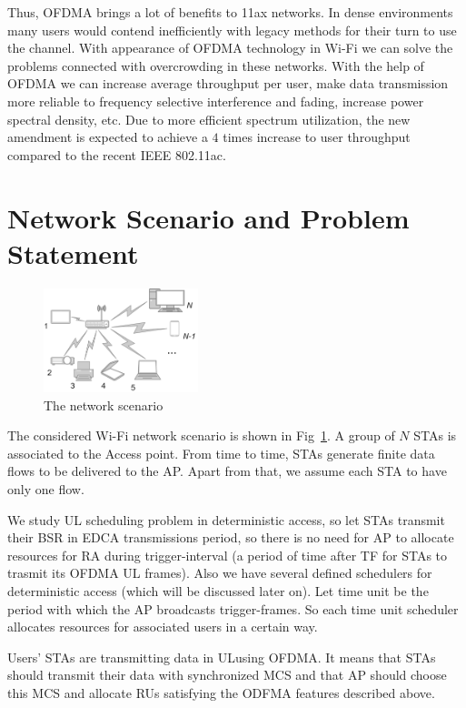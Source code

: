 Thus, OFDMA brings a lot of benefits to 11ax networks. In dense environments many users would contend inefficiently with legacy methods for their turn to use the channel. 
With appearance of OFDMA technology in Wi-Fi we can solve the problems connected with overcrowding in these networks.
With the help of OFDMA we can increase average throughput per user, make data transmission more reliable to frequency selective interference and fading, increase power spectral density, etc. Due to more efficient spectrum utilization, the new amendment is expected to achieve a $4$ times increase to user throughput compared to the recent IEEE 802.11ac.

\section{Network Scenario and Problem Statement}
\label{sec:scenario}

\begin{figure}[t]
	\includegraphics[width = 0.4\textwidth]{NetworkScenario}
	\caption{\label{fig:scenario} The network scenario}
\end{figure}

The considered Wi-Fi network scenario is shown in Fig~\ref{fig:scenario}. A group of $N$ STAs is associated to the Access point. 
From time to time, STAs generate finite data flows to be delivered to the AP. Apart from that, we assume each STA to have only one flow.

We study UL scheduling problem in deterministic access, so let STAs transmit their BSR in EDCA transmissions period, so there is no need for AP to allocate resources for RA during trigger-interval (a period of time after TF for STAs to trasmit its OFDMA UL frames).
Also we have several defined schedulers for deterministic access (which will be discussed later on). 
Let time unit be the period with which the AP broadcasts trigger-frames.
So each time unit scheduler allocates resources for associated users in a certain way.

Users' STAs are transmitting data in ULusing OFDMA. 
It means that STAs should transmit their data with synchronized MCS and that AP should choose this MCS and allocate RUs satisfying the ODFMA features described above. 

